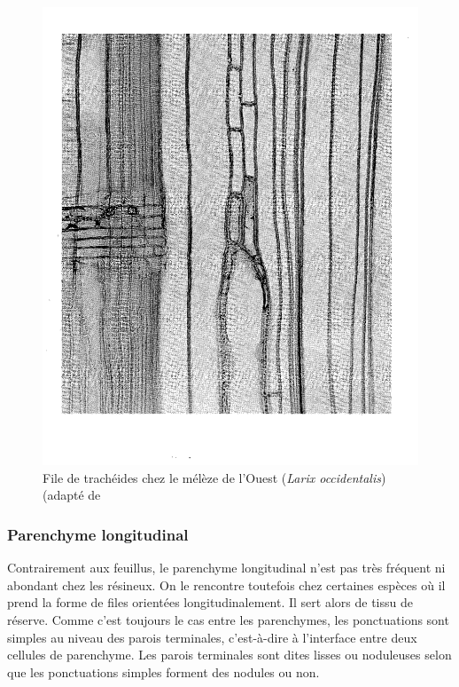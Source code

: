 \begin{figure}[h]
\centering
\includegraphics[scale=0.2]{img/file}
\caption{File de trachéides chez le mélèze de l'Ouest (\textit{Larix occidentalis}) (adapté de \cite{panshin1980textbook}}
\label{fig:file}
\end{figure}

\subsubsection{Parenchyme longitudinal}

Contrairement aux feuillus, le parenchyme longitudinal n'est pas très fréquent ni abondant chez les résineux. On le rencontre toutefois chez certaines espèces où il prend la forme de files orientées longitudinalement. Il sert alors de tissu de réserve. Comme c'est toujours le cas entre les parenchymes, les ponctuations sont simples au niveau des parois terminales, c'est-à-dire à l'interface entre deux cellules de parenchyme. Les parois terminales sont dites lisses ou noduleuses selon que les ponctuations simples forment des nodules ou non.\\

